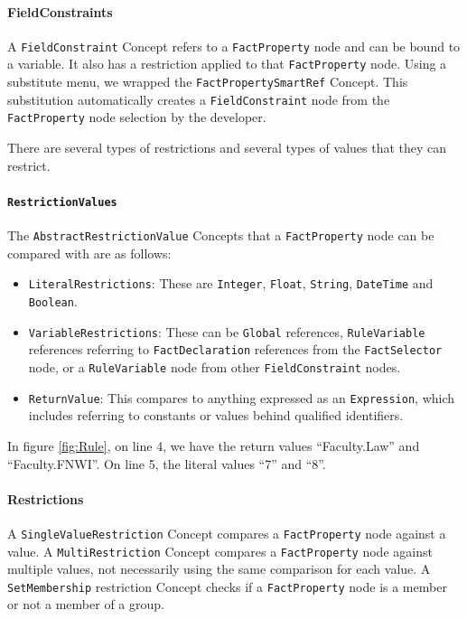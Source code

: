 \paragraph{FieldConstraints} A \texttt{FieldConstraint} Concept refers to a \texttt{FactProperty} node and can be bound to a variable.
It also has a restriction applied to that \texttt{FactProperty} node.
Using a substitute menu, we wrapped the \texttt{FactPropertySmartRef} Concept.
This substitution automatically creates a \texttt{FieldConstraint} node from the \texttt{FactProperty} node selection by the developer.

There are several types of restrictions and several types of values that they can restrict.

\paragraph{\texttt{RestrictionValues}} The \texttt{AbstractRestrictionValue} Concepts that a \texttt{FactProperty} node can be compared with are as follows:
\begin{itemize}    
    \setlength\itemsep{0em}
    \item \texttt{LiteralRestrictions}: These are \texttt{Integer}, \texttt{Float}, \texttt{String}, \texttt{DateTime} and \texttt{Boolean}.
    \item \texttt{VariableRestrictions}: These can be \texttt{Global} references, \texttt{RuleVariable} references referring to \texttt{FactDeclaration} references from the \texttt{FactSelector} node, or a \texttt{RuleVariable} node from other \texttt{FieldConstraint} nodes.
    \item \texttt{ReturnValue}: This compares to anything expressed as an \texttt{Expression}, which includes referring to constants or values behind qualified identifiers.
\end{itemize}

In figure \ref{fig:Rule}, on line 4, we have the return values ``Faculty.Law'' and ``Faculty.FNWI''.
On line 5, the literal values ``7'' and ``8''.

\paragraph{Restrictions} A \texttt{SingleValueRestriction} Concept compares a \texttt{FactProperty} node against a value.
A \texttt{MultiRestriction} Concept compares a \texttt{FactProperty} node against multiple values, not necessarily using the same comparison for each value.
A \texttt{SetMembership} restriction Concept checks if a \texttt{FactProperty} node is a member or not a member of a group.


